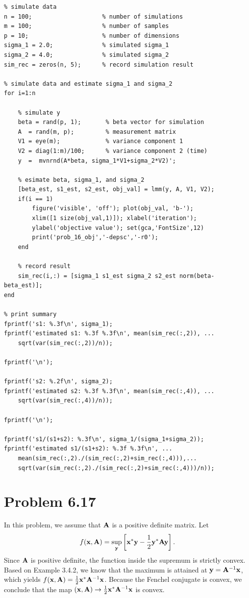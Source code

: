 \documentclass{scrartcl}
\begin{document}
\begin{verbatim}
% simulate data
n = 100;                    % number of simulations
m = 100;                    % number of samples
p = 10;                     % number of dimensions
sigma_1 = 2.0;              % simulated sigma_1
sigma_2 = 4.0;              % simulated sigma_2
sim_rec = zeros(n, 5);      % record simulation result

% simulate data and estimate sigma_1 and sigma_2
for i=1:n
    
    % simulate y
    beta = rand(p, 1);       % beta vector for simulation
    A  = rand(m, p);         % measurement matrix
    V1 = eye(m);             % variance component 1
    V2 = diag(1:m)/100;      % variance component 2 (time)
    y  =  mvnrnd(A*beta, sigma_1*V1+sigma_2*V2)';
    
    % esimate beta, sigma_1, and sigma_2
    [beta_est, s1_est, s2_est, obj_val] = lmm(y, A, V1, V2);
    if(i == 1)
        figure('visible', 'off'); plot(obj_val, 'b-');
        xlim([1 size(obj_val,1)]); xlabel('iteration');
        ylabel('objective value'); set(gca,'FontSize',12)
        print('prob_16_obj','-depsc','-r0');
    end
    
    % record result
    sim_rec(i,:) = [sigma_1 s1_est sigma_2 s2_est norm(beta-beta_est)];
end

% print summary
fprintf('s1: %.3f\n', sigma_1);
fprintf('estimated s1: %.3f %.3f\n', mean(sim_rec(:,2)), ...
    sqrt(var(sim_rec(:,2))/n));

fprintf('\n');

fprintf('s2: %.2f\n', sigma_2);
fprintf('estimated s2: %.3f %.3f\n', mean(sim_rec(:,4)), ...
    sqrt(var(sim_rec(:,4))/n));

fprintf('\n');

fprintf('s1/(s1+s2): %.3f\n', sigma_1/(sigma_1+sigma_2));
fprintf('estimated s1/(s1+s2): %.3f %.3f\n', ...
    mean(sim_rec(:,2)./(sim_rec(:,2)+sim_rec(:,4))),...
    sqrt(var(sim_rec(:,2)./(sim_rec(:,2)+sim_rec(:,4)))/n));
\end{verbatim}


\section*{Problem 6.17}

In this problem, we assume that $\mathbf{A}$ is a positive definite matrix. Let
\begin{equation}
f(\mathbf{x}, \mathbf{A}) = \sup_{\mathbf{y}} \left[ \mathbf{x}^*\mathbf{y} - {1 \over 2} \mathbf{y}^*\mathbf{A}\mathbf{y} \right].
\end{equation}
Since $\mathbf{A}$ is positive definite, the function inside the supremum is strictly convex. Based on Example 3.4.2, we know that the maximum is attained at
$\mathbf{y} = \mathbf{A}^{-1}\mathbf{x}$, which yields $f(\mathbf{x}, \mathbf{A}) = {1 \over 2} \mathbf{x}^*\mathbf{A}^{-1}\mathbf{x}$.
Because the Fenchel conjugate is convex, we conclude that the map $(\mathbf{x},\mathbf{A}) \rightarrow {1 \over 2} \mathbf{x}^*\mathbf{A}^{-1}\mathbf{x}$ is convex.
\end{document}
